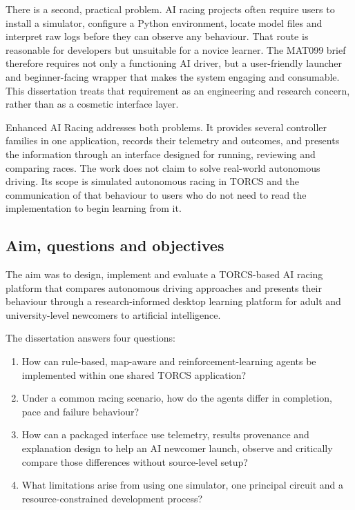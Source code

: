 There is a second, practical problem. AI racing projects often require users to install a simulator, configure a Python environment, locate model files and interpret raw logs before they can observe any behaviour. That route is reasonable for developers but unsuitable for a novice learner. The MAT099 brief therefore requires not only a functioning AI driver, but a user-friendly launcher and beginner-facing wrapper that makes the system engaging and consumable. This dissertation treats that requirement as an engineering and research concern, rather than as a cosmetic interface layer.

Enhanced AI Racing addresses both problems. It provides several controller families in one application, records their telemetry and outcomes, and presents the information through an interface designed for running, reviewing and comparing races. The work does not claim to solve real-world autonomous driving. Its scope is simulated autonomous racing in TORCS and the communication of that behaviour to users who do not need to read the implementation to begin learning from it.

\subsection{Aim, questions and objectives}

The aim was to design, implement and evaluate a TORCS-based AI racing platform that compares autonomous driving approaches and presents their behaviour through a research-informed desktop learning platform for adult and university-level newcomers to artificial intelligence.

The dissertation answers four questions:
\begin{enumerate}[label=\arabic*.]
  \item How can rule-based, map-aware and reinforcement-learning agents be implemented within one shared TORCS application?
  \item Under a common racing scenario, how do the agents differ in completion, pace and failure behaviour?
  \item How can a packaged interface use telemetry, results provenance and explanation design to help an AI newcomer launch, observe and critically compare those differences without source-level setup?
  \item What limitations arise from using one simulator, one principal circuit and a resource-constrained development process?
\end{enumerate}

